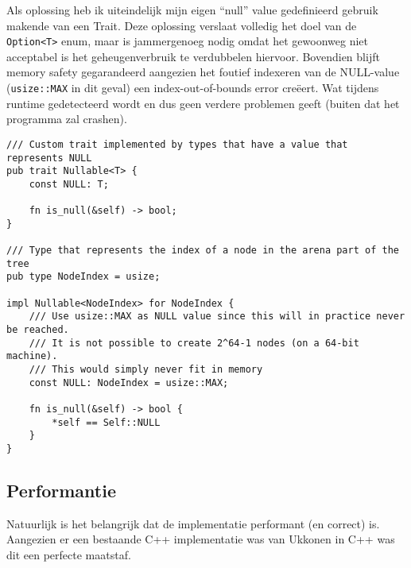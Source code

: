 Als oplossing heb ik uiteindelijk mijn eigen ``null'' value gedefinieerd gebruik makende van een Trait.
Deze oplossing verslaat volledig het doel van de \texttt{Option<T>} enum, maar is jammergenoeg nodig omdat het gewoonweg niet acceptabel is het geheugenverbruik te verdubbelen hiervoor.
Bovendien blijft memory safety gegarandeerd aangezien het foutief indexeren van de NULL-value (\texttt{usize::MAX} in dit geval) een index-out-of-bounds error creëert.
Wat tijdens runtime gedetecteerd wordt en dus geen verdere problemen geeft (buiten dat het programma zal crashen).

\begin{verbatim}
/// Custom trait implemented by types that have a value that represents NULL
pub trait Nullable<T> {
    const NULL: T;

    fn is_null(&self) -> bool;
}

/// Type that represents the index of a node in the arena part of the tree
pub type NodeIndex = usize;

impl Nullable<NodeIndex> for NodeIndex {
    /// Use usize::MAX as NULL value since this will in practice never be reached.
    /// It is not possible to create 2^64-1 nodes (on a 64-bit machine).
    /// This would simply never fit in memory
    const NULL: NodeIndex = usize::MAX;

    fn is_null(&self) -> bool {
        *self == Self::NULL
    }
}
\end{verbatim}

\subsection{Performantie}\label{subsec:performantie}
Natuurlijk is het belangrijk dat de implementatie performant (en correct) is.
Aangezien er een bestaande C++ implementatie was van Ukkonen in C++ was dit een perfecte maatstaf.

